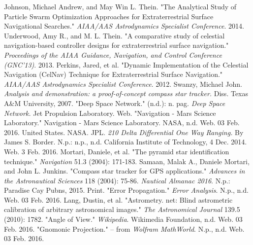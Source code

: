 \documentclass[]{aiaa-tc}%
\begin{document}

\begin{thebibliography}{9}%
Johnson, Michael Andrew, and May Win L. Thein. "The Analytical Study of Particle Swarm Optimization Approaches for Extraterrestrial Surface Navigational Searches." \textit{AIAA/AAS Astrodynamics Specialist Conference}. 2014.
 Underwood, Amy R., and M. L. Thein. "A comparative study of celestial navigation-based controller designs for extraterrestrial surface navigation." \textit{Proceedings of the AIAA Guidance, Navigation, and Control Conference (GNC’13)}. 2013.
 Perkins, Jared, et al. "Dynamic Implementation of the Celestial Navigation (CelNav) Technique for Extraterrestrial Surface Navigation." \textit{AIAA/AAS Astrodynamics Specialist Conference}. 2012.
 Swanzy, Michael John. \textit{Analysis and demonstration: a proof-of-concept compass star tracker.} Diss. Texas A\&M University, 2007.
 "Deep Space Network." (n.d.): n. pag. \textit{Deep Space Network.} Jet Propulsion Laboratory. Web.
 "Navigation - Mars Science Laboratory." Navigation - Mars Science Laboratory. NASA, n.d. Web. 03 Feb. 2016.
 United States. NASA. JPL. \textit{210 Delta Differential One Way Ranging.} By James S. Border. N.p.: n.p., n.d. California Institute of Technology, 4 Dec. 2014. Web. 3 Feb. 2016.
 Mortari, Daniele, et al. "The pyramid star identification technique." \textit{Navigation} 51.3 (2004): 171-183.
 Samaan, Malak A., Daniele Mortari, and John L. Junkins. "Compass star tracker for GPS applications." \textit{Advances in the Astronautical Sciences} 118 (2004): 75-86.
 \textit{Nautical Almanac 2016}. N.p.: Paradise Cay Pubns, 2015. Print.
 "Error Propagation." \textit{Error Analysis}. N.p., n.d. Web. 03 Feb. 2016.
Lang, Dustin, et al. "Astrometry. net: Blind astrometric calibration of arbitrary astronomical images." \textit{The Astronomical Journal} 139.5 (2010): 1782.
"Angle of View." \textit{Wikipedia}. Wikimedia Foundation, n.d. Web. 03 Feb. 2016.
"Gnomonic Projection." -- from \textit{Wolfram MathWorld}. N.p., n.d. Web. 03 Feb. 2016.
\end{thebibliography}
\end{document}
